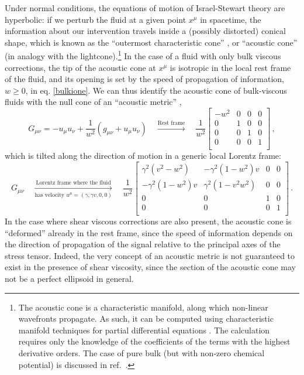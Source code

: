 \documentclass[aps, prd, showkeys,superscriptaddress, nofootinbib,floatfix]{revtex4-2}
\begin{document}
Under normal conditions, the equations of motion of Israel-Stewart theory are hyperbolic: if we perturb the fluid at a given point $x^\mu$ in spacetime, the information about our intervention travels inside a (possibly distorted) conical shape, which is known as the ``outermost characteristic cone'' \cite{CourantHilbert2_book}, or ``acoustic cone'' (in analogy with the lightcone).\footnote{The acoustic cone is a characteristic manifold, along which non-linear wavefronts propagate. As such, it can be computed using characteristic manifold techniques for partial differential equations \cite{Bemfica:2019cop,Bemfica:2020xym}. The calculation requires only the knowledge of the coefficients of the terms with the highest derivative orders. The case of pure bulk (but with non-zero chemical potential) is discussed in ref.~\cite{Bemfica:2019cop}.} In the case of a fluid with only bulk viscous corrections, the tip of the acoustic cone at $x^\mu$ is isotropic in the local rest frame of the fluid, and its opening is set by the speed of propagation of information, $w\geq 0$, in eq. \eqref{bulkione}.
We can thus identify the acoustic cone of bulk-viscous fluids with the null cone of an ``acoustic metric'' \cite{ChristodoluouShocks,Bemfica:2019cop,Babichev:2007dw,DisconziAcoustic2019},
\begin{equation}
G_{\mu \nu}=-u_\mu u_\nu +\dfrac{1}{w^2} (g_{\mu \nu}+u_\mu u_\nu) \quad \xrightarrow[]{\text{Rest frame}} \quad \dfrac{1}{w^2} \begin{bmatrix}
-w^2 & 0 & 0 & 0 \\
0 & 1 & 0 & 0 \\
0 & 0 & 1 & 0 \\
0 & 0 & 0 & 1 \\
\end{bmatrix} \, ,
\end{equation}
which is tilted along the direction of motion in a generic local Lorentz frame:
\begin{equation}
G_{\mu \nu} \quad \xrightarrow[\text{has velocity }u^\mu=(\gamma, \gamma v,0,0)]{\text{Lorentz frame where the fluid}} \quad  \dfrac{1}{w^2} 
\begin{bmatrix}
\gamma^2 (v^2{-}w^2) & -\gamma^2 (1{-}w^2) v & 0 & 0 \\
-\gamma^2 (1{-}w^2) v & \gamma^2 (1{-}v^2 w^2) & 0 & 0 \\
0 & 0 & 1 & 0 \\
0 & 0 & 0 & 1 \\
\end{bmatrix} \, .
\end{equation}
In the case where shear viscous corrections are also present, the acoustic cone is ``deformed'' already in the rest frame, since the speed of information depends on the direction of propagation of the signal relative to the principal axes of the stress tensor. Indeed, the very concept of an acoustic metric is not guaranteed to exist in the presence of shear viscosity, since the section of the acoustic cone may not be a perfect ellipsoid in general. 
\end{document}
